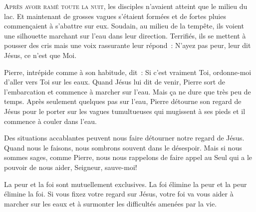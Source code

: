 \dvrule






\lettrine{A}{près avoir ramé toute la nuit,}
 les disciples n'avaient atteint que le milieu du lac.
 Et maintenant de grosses vagues s'étaient formées et de fortes pluies
 commençaient à s'abattre sur eux. Soudain, au milieu de la tempête,
 ils voient une silhouette marchant sur l'eau dans leur direction.
 Terrifiés, ils se mettent à pousser des cris
 \ocadr {}
 mais une voix rassurante leur répond~:
 \og N'ayez pas peur, leur dit Jésus, ce n'est que Moi. \fg{}


Pierre, intrépide  comme à son habitude, dit~: 
 \og Si c'est vraiment Toi, ordonne-moi d'aller vers Toi sur les eaux. \fg{}
 Quand Jésus lui dit de venir, Pierre sort de l'embarcation et commence
 à marcher sur l'eau. Mais ça ne dure que très peu de temps.
 Après seulement quelques pas sur l'eau, Pierre détourne son  regard
 de Jésus pour le porter sur les vagues tumultueuses qui mugissent à ses pieds
 \ocadr {} et il commence à couler dans l'eau. 

Des situations accablantes peuvent nous faire détourner notre regard de Jésus.
 Quand nous le faisons, nous sombrons souvent dans le désespoir.
 Mais si nous sommes sages, comme Pierre, nous nous rappelons
 de faire appel au Seul qui a le pouvoir de nous aider,
 \og Seigneur, sauve-moi! \fg{}

La peur et la foi sont mutuellement exclusives. La foi élimine la peur
 et la peur élimine la foi. Si vous fixez votre regard sur Jésus,
 votre foi va vous aider à marcher sur les eaux et à surmonter
 les difficultés amenées par la vie. 

